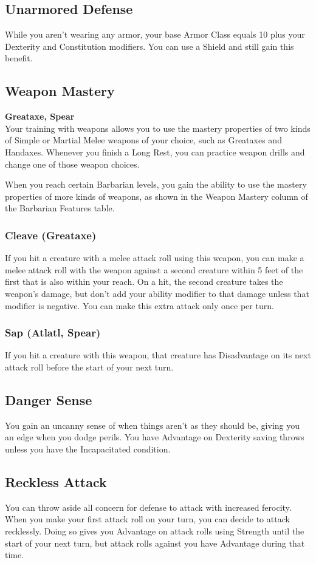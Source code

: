 \documentclass[letterpaper,openany,oneside,twocolumn]{book}
\begin{document}
\subsection*{Unarmored Defense}
While you aren't wearing any armor, your base Armor Class equals 10 plus your Dexterity and Constitution modifiers. You can use a Shield and still gain this benefit.
\subsection*{Weapon Mastery}
\textbf{Greataxe, Spear}\\
Your training with weapons allows you to use the mastery properties of two kinds of Simple or Martial Melee weapons of your choice, such as Greataxes and Handaxes. Whenever you finish a Long Rest, you can practice weapon drills and change one of those weapon choices.

When you reach certain Barbarian levels, you gain the ability to use the mastery properties of more kinds of weapons, as shown in the Weapon Mastery column of the Barbarian Features table.
\subsubsection*{Cleave (Greataxe)}
If you hit a creature with a melee attack roll using this weapon, you can make a melee attack roll with the weapon against a second creature within 5 feet of the first that is also within your reach. On a hit, the second creature takes the weapon's damage, but don't add your ability modifier to that damage unless that modifier is negative. You can make this extra attack only once per turn.
\subsubsection*{Sap (Atlatl, Spear)}
If you hit a creature with this weapon, that creature has Disadvantage on its next attack roll before the start of your next turn.
\subsection*{Danger Sense}
You gain an uncanny sense of when things aren't as they should be, giving you an edge when you dodge perils. You have Advantage on Dexterity saving throws unless you have the Incapacitated condition.
\subsection*{Reckless Attack}
You can throw aside all concern for defense to attack with increased ferocity. When you make your first attack roll on your turn, you can decide to attack recklessly. Doing so gives you Advantage on attack rolls using Strength until the start of your next turn, but attack rolls against you have Advantage during that time.
\end{document}
